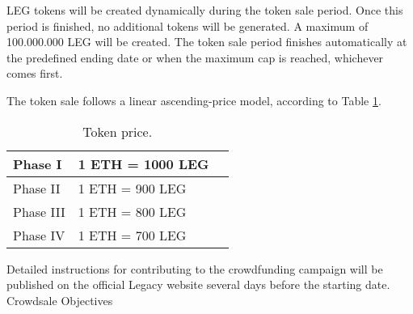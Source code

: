 LEG tokens will be created dynamically during the token sale period. Once this period is finished, no additional tokens will be generated. A maximum of 100.000.000 LEG will be created. The token sale period finishes automatically at the predefined ending date or when the maximum cap is reached, whichever comes first.

The token sale follows a linear ascending-price model, according to Table \ref{table:ico_summary}.

\begin{table}[h]
	\begin{center}
			\small
			\begin{tabular}{| l | p{5cm} | p{3cm}  |}	
		    \hline	
		    	Phase I		&  1 ETH = 1000 LEG  \\ \hline
		    	Phase II		&  1 ETH = 900 LEG  \\ \hline
		    	Phase III	&  1 ETH = 800 LEG  \\ \hline
		    	Phase IV		&  1 ETH = 700 LEG  \\		    	
			\hline	
			\end{tabular}				
	\caption{Token price.}
	\label{table:ico_summary}		
	\end{center}
\end{table}

Detailed instructions for contributing to the crowdfunding campaign will be published on the official Legacy website several days before the starting date.  
Crowdsale Objectives




